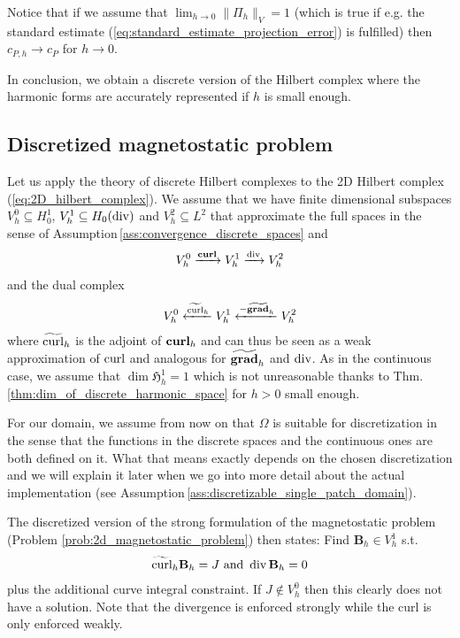 \documentclass[../master_thesis.tex]{subfiles}
\begin{document}
Notice that if we assume that $\lim_{h \rightarrow 0} \lVert \Pi_h \rVert _V = 1$ 
(which is true if e.g. the standard estimate (\ref{eq:standard_estimate_projection_error}) is fulfilled)
then $c_{P,h} \rightarrow c_P$ for $h \rightarrow 0$.

In conclusion, we obtain a discrete version of the Hilbert complex where the harmonic forms are 
accurately represented if $h$ is small enough.

\subsection{Discretized magnetostatic problem}

Let us apply the theory of discrete Hilbert complexes to the 2D Hilbert complex (\ref{eq:2D_hilbert_complex}).
We assume that we have finite dimensional subspaces
$V^0_h \subseteq H^1_0$, $V^1_h \subseteq H_0(\operatorname{div})$ and $V^2_h \subseteq L^2$ 
that approximate the full spaces in the sense of Assumption\,\ref{ass:convergence_discrete_spaces} and
\begin{align*}
    V^0_h \xrightarrow{\veccurl} V^1_h \xrightarrow{\diver} V^2_h
\end{align*}
and the dual complex 
\begin{align*}
    V^0_h \xleftarrow{\widetilde{\curl}_h} V^1_h \xleftarrow{-\widetilde{\bm{\grad}}_h} V^2_h
\end{align*}
where $\widetilde{\operatorname{curl}}_h$ is the adjoint of $\veccurl_h$ and can thus be 
seen as a weak approximation of $\operatorname{curl}$ and analogous for $\widetilde{\bm{\grad}}_h$ 
and $\diver$.
As in the continuous case, we assume that $\dim \mathfrak{H}_h^1 = 1$ 
which is not unreasonable thanks to Thm.\,\ref{thm:dim_of_discrete_harmonic_space} 
for $h>0$ small enough.

For our domain, we assume from now on that $\Omega$ is suitable for discretization in the 
sense that the functions in the discrete spaces and the continuous ones 
are both defined on it. What that means exactly depends on the chosen discretization 
and we will explain it later when we go into more detail about the 
actual implementation (see Assumption\,\ref{ass:discretizable_single_patch_domain}). 

The discretized version of the strong formulation of the magnetostatic problem 
(Problem \ref{prob:2d_magnetostatic_problem}) 
then states: 
Find $\mathbf{B}_h \in V_h^1$ s.t.
\begin{align*}
    \weakcurl_h \mathbf{B}_h = J \text{ and }
    \diver \mathbf{B}_h = 0
\end{align*}
plus the additional curve integral constraint. If $J \notin V_h^0$ then this 
clearly does not have a solution.
Note that the divergence is enforced strongly while the curl is only enforced weakly.
\end{document}
